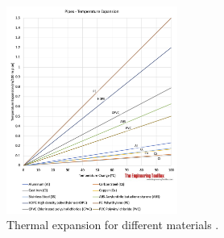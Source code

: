 \begin{figure}[H]
    \centering
    \includegraphics[width = 0.5\textwidth]{img/fig25.png}
    \caption{Thermal expansion for different materials \cite{therm}.}
    \label{themExpan}
\end{figure}

